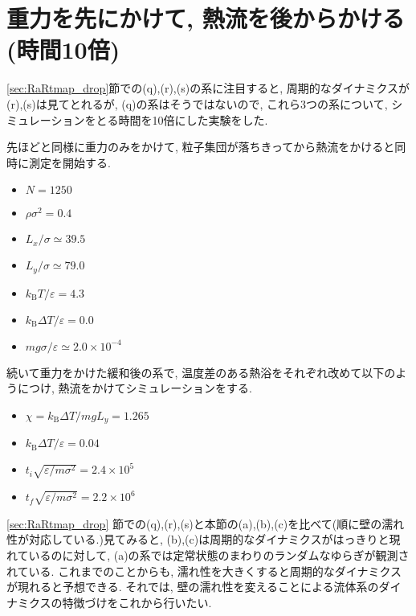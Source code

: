 \section{重力を先にかけて, 熱流を後からかける(時間10倍)}\label{sec:RaRtmap10_drop}

\ref{sec:RaRtmap_drop}節での(q),(r),(s)の系に注目すると, 周期的なダイナミクスが(r),(s)は見てとれるが, (q)の系はそうではないので, これら3つの系について, シミュレーションをとる時間を10倍にした実験をした. 

先ほどと同様に重力のみをかけて, 粒子集団が落ちきってから熱流をかけると同時に測定を開始する.

\begin{itemize}
  \item $N = 1250$
  \item $\rho \sigma^2 = 0.4$
  \item $L_x / \sigma \simeq 39.5$
  \item $L_y / \sigma \simeq 79.0$
  \item $k_{\text{B}} T/\varepsilon = 4.3$
  \item $k_{\text{B}} \Delta T/\varepsilon = 0.0$
  \item $mg\sigma/\varepsilon \simeq 2.0 \times 10^{-4}$
\end{itemize}

続いて重力をかけた緩和後の系で, 温度差のある熱浴をそれぞれ改めて以下のようにつけ, 熱流をかけてシミュレーションをする. 

\begin{itemize}
  \item $\chi = k_{\text{B}}\Delta T / mg L_y = 1.265$
  \item $k_{\text{B}} \Delta T/\varepsilon = 0.04$
  \item $t_i \sqrt{\varepsilon / m \sigma^2} = 2.4 \times 10^{5}$
  \item $t_f \sqrt{\varepsilon / m \sigma^2} = 2.2 \times 10^{6}$
\end{itemize}

\ref{sec:RaRtmap_drop} 節での(q),(r),(s)と本節の(a),(b),(c)を比べて(順に壁の濡れ性が対応している.)見てみると, (b),(c)は周期的なダイナミクスがはっきりと現れているのに対して, (a)の系では定常状態のまわりのランダムなゆらぎが観測されている. これまでのことからも, 濡れ性を大きくすると周期的なダイナミクスが現れると予想できる. それでは, 壁の濡れ性を変えることによる流体系のダイナミクスの特徴づけをこれから行いたい. 

